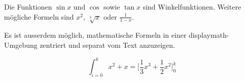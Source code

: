 \documentclass{article}
\begin{document}
  Die Funktionen
  $ \sin x$
  und
  \( \cos \)
  sowie
  \begin{math} \tan x \end{math}
  sind Winkelfunktionen. Weitere mögliche Formeln sind $ x^2 $, $ \sqrt[3]{x} $ oder $ \frac{1}{1-x} $.

  Es ist ausserdem möglich, mathematische Formeln in einer displaymath-Umgebung zentriert und separat vom Text anzuzeigen.

  \begin{displaymath}
    \int_{i=0}^k x^2 + x = \bigl[ \frac{1}{3} x^3 + \frac{1}{2} x^2 \bigr]_0^k
  \end{displaymath}
\end{document}
